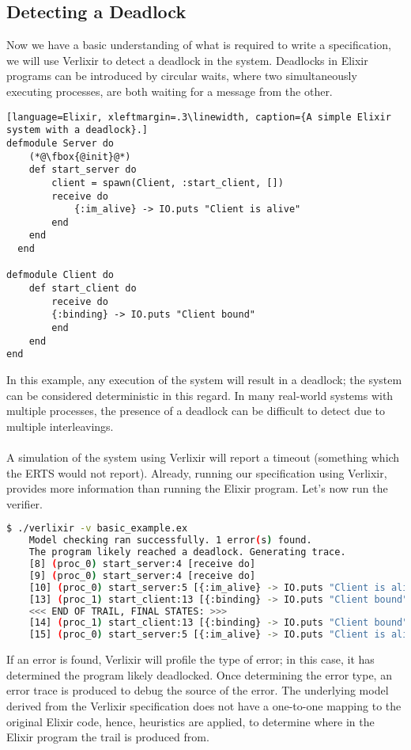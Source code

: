 \subsection{Detecting a Deadlock} \label{sec:deadlock}
Now we have a basic understanding of what is required to write a specification, we will use Verlixir to detect a deadlock in the system. Deadlocks in Elixir programs can be introduced by circular waits, where two simultaneously executing processes, are both waiting for a message from the other. 
\begin{lstlisting}[language=Elixir, xleftmargin=.3\linewidth, caption={A simple Elixir system with a deadlock}.]
defmodule Server do
    (*@\fbox{@init}@*)
    def start_server do
        client = spawn(Client, :start_client, [])
        receive do
            {:im_alive} -> IO.puts "Client is alive"
        end
    end
  end
  
defmodule Client do
    def start_client do
        receive do
        {:binding} -> IO.puts "Client bound"
        end
    end
end  
\end{lstlisting}
In this example, any execution of the system will result in a deadlock; the system can be considered deterministic in this regard. In many real-world systems with multiple processes, the presence of a deadlock can be difficult to detect due to multiple interleavings.
\\ \\
A simulation of the system using Verlixir will report a timeout (something which the ERTS would not report). Already, running our specification using Verlixir, provides more information than running the Elixir program. Let's now run the verifier.
\begin{lstlisting}[language=bash, xleftmargin=.1\linewidth]
    $ ./verlixir -v basic_example.ex
    Model checking ran successfully. 1 error(s) found.
    The program likely reached a deadlock. Generating trace.
    [8] (proc_0) start_server:4 [receive do]
    [9] (proc_0) start_server:4 [receive do]
    [10] (proc_0) start_server:5 [{:im_alive} -> IO.puts "Client is alive"]
    [13] (proc_1) start_client:13 [{:binding} -> IO.puts "Client bound"]
    <<< END OF TRAIL, FINAL STATES: >>>
    [14] (proc_1) start_client:13 [{:binding} -> IO.puts "Client bound"]
    [15] (proc_0) start_server:5 [{:im_alive} -> IO.puts "Client is alive"]
\end{lstlisting}
If an error is found, Verlixir will profile the type of error; in this case, it has determined the program likely deadlocked. Once determining the error type, an error trace is produced to debug the source of the error. The underlying model derived from the Verlixir specification does not have a one-to-one mapping to the original Elixir code, hence, heuristics are applied, to determine where in the Elixir program the trail is produced from.
